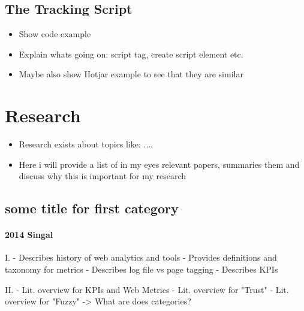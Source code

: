 \subsection{The Tracking Script}

\begin{itemize}
\item Show code example
\item Explain whats going on: script tag, create script element etc.
\item Maybe also show Hotjar example to see that they are similar
\end{itemize}
















\section{Research}


\begin{itemize}
\item Research exists about topics like: ....
\item Here i will provide a list of in my eyes relevant papers, summaries them and discuss why this is important for my research
\end{itemize}



\subsection{some title for first category}

\paragraph{2014 Singal}

I.
- Describes history of web analytics and tools
- Provides definitions and taxonomy for metrics
- Describes log file vs page tagging
- Describes KPIs

II.
- Lit. overview for KPIs and Web Metrics
- Lit. overview for "Trust"
- Lit. overview for "Fuzzy"
-> What are does categories?



